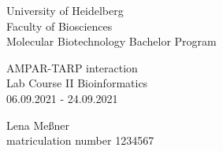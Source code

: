 \documentclass[a4paper,12pt]{report}
\begin{document}
\onehalfspacing
{}
	
\begin{titlepage}
	\begin{flushleft}University of Heidelberg\\
	 Faculty of Biosciences\\
	 Molecular Biotechnology Bachelor Program\\
	\end{flushleft}
\vspace*{6.5cm}
	\begin{center}
		\huge AMPAR-TARP interaction\\ \bigskip
    	\Large Lab Course II Bioinformatics\\ \smallskip
    	\large 06.09.2021 - 24.09.2021
    	\normalsize
	\end{center}
\vspace*{\fill}
	\begin{flushright} 
	\large Lena Meßner\\ \normalsize
	matriculation number 1234567
	\end{flushright}
\end{titlepage}

\renewcommand\abstractname{} %
\begin{abstract}
	
\end{abstract}
\end{document}
